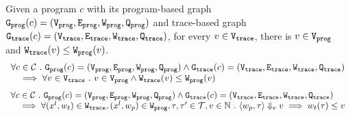 \begin{lem}
	\label{lem:weights_map}
	Given a program $c$ with its
	program-based graph $\progG({c}) = (\progV, \progE, \progW, \progF)$
	and 
	trace-based graph $\traceG({c}) = (\traceV, \traceE, \traceW, \traceF)$,
	for every $v \in \traceV$, there is $v \in \progV$ and $\traceW(v) \leq \progW(v)$.
%
%
\[
	\begin{array}{l}
	\forall c \in \cdom 
	 \sthat 
	 \progG({c}) = (\progV, \progE, \progW, \progF)
	\land 
	\traceG({c}) = (\traceV, \traceE, \traceW, \traceF)
	\\ \quad
	\implies
	\forall v \in \traceV \sthat 
	v \in \progV \land
	\traceW(v) \leq \progW(v)
	\end{array}
	\]
	\[
		\begin{array}{l}
			\forall c \in \cdom 
			 \sthat 
			 \progG({c}) = (\progV, \progE, \progW, \progF)
			\land 
			\traceG({c}) = (\traceV, \traceE, \traceW, \traceF)
			\\ \quad
			\implies
			\forall (x^l, w_{t}) \in \traceW,
			(x^l, w_{p}) \in \progW, \vtrace, \trace' \in \mathcal{T}, v \in \mathbb{N} \sthat
			\config{w_{p}, \trace} \earrow v
			\implies
			w_{t}(\trace) \leq v
		\end{array}
		\]
	\end{lem}
